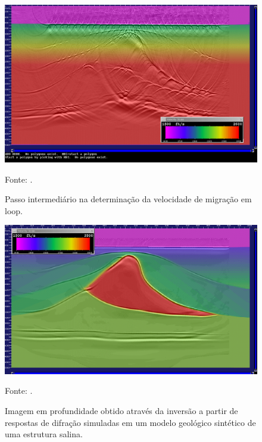 \begin{figure}[htb]
\caption{Passo intermediário na determinação da velocidade de migração em loop.}
\begin{center}
\includegraphics[scale=0.30]{images/simula_diff_campo.png}
\vspace{-0.3cm}
\end{center}
\begin{center}
 Fonte: \cite{diffractions}.
\end{center}
\label{fig:8.2}
\end{figure}

\begin{figure}[htb]
\caption{Imagem em profundidade obtido através da inversão a partir de respostas de difração simuladas 
em um modelo geológico sintético de uma estrutura salina.}
\begin{center}
\includegraphics[scale=0.30]{images/simula_diff_vel.png}
\vspace{-0.3cm}
\end{center}
\begin{center}
 Fonte: \cite{diffractions}.
\end{center}
\label{fig:8.3}
\end{figure}





